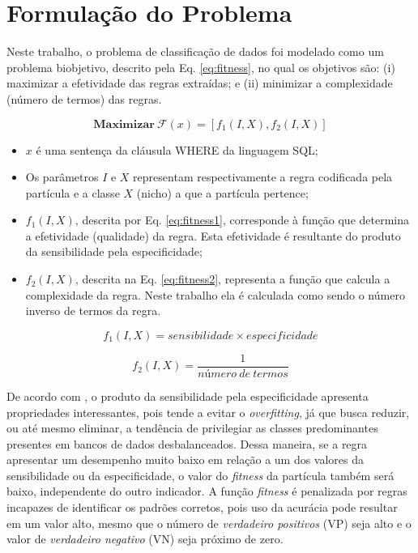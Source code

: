 \documentclass[
	12pt,				%
	openany,			%
	oneside,	
	a4paper,			%
	brazil,				%
	]{unimontes-ppgmsc-abntex2}
\begin{document}
\section{Formulação do Problema}
\label{sec:form_problema}

Neste trabalho, o problema de classificação de dados foi modelado como um problema  biobjetivo, descrito pela Eq. \ref{eq:fitness}, no qual os objetivos são: (i) maximizar a efetividade das regras extraídas; e (ii) minimizar a complexidade (número de termos) das regras. 

\begin{equation}
\label{eq:fitness}
\textbf{Maximizar}\ \mathcal{F}(x) = [f_1(I,X), f_2(I,X)]
\end{equation}

\begin{itemize}
   \item $x$ é uma sentença da cláusula WHERE da linguagem SQL;
   \item Os parâmetros $I$ e $X$ representam respectivamente a regra codificada pela partícula e a classe $X$ (nicho) a que a partícula pertence;
   \item $f_1(I,X)$, descrita por Eq. \ref{eq:fitness1}, corresponde à função que determina a efetividade (qualidade) da regra. Esta efetividade é resultante do produto da sensibilidade pela especificidade; 
   \item $f_2(I,X)$, descrita na Eq. \ref{eq:fitness2}, representa a função que calcula a complexidade da regra. Neste trabalho ela é calculada como sendo o número inverso de termos da regra.
\end{itemize}

\begin{equation}
\label{eq:fitness1}
f_1(I,X) = sensibilidade \times especificidade
\end{equation}

\begin{equation}
\label{eq:fitness2}
f_2(I,X) = \frac{1}{número\ de\ termos}
\end{equation}

De acordo com , o produto da sensibilidade pela especificidade apresenta propriedades interessantes, pois tende a evitar o {\em overfitting}, já que busca reduzir, ou até mesmo eliminar, a tendência de privilegiar as classes predominantes presentes em bancos de dados desbalanceados. Dessa maneira, se a regra apresentar um desempenho muito baixo em relação a um dos valores da sensibilidade ou da especificidade, o valor do {\em fitness} da partícula também será baixo, independente do outro indicador. A função {\em fitness} é penalizada por regras incapazes de identificar os padrões corretos, pois uso da acurácia pode resultar em um valor alto, mesmo que o número de {\em verdadeiro positivos} (VP) seja alto e o valor de {\em verdadeiro negativo} (VN) seja próximo de zero. 
\end{document}
